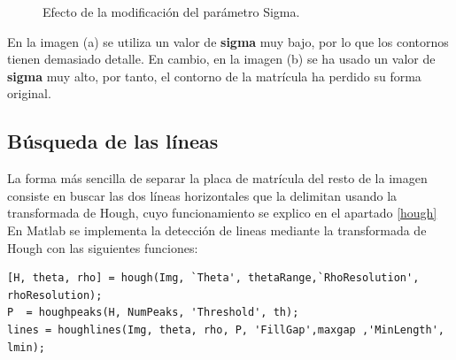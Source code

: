 \begin{figure}[!h]
\centering {}
\caption{\small{Efecto de la modificación del parámetro Sigma.}} \label{Cannysigma}
\end{figure} 

En la imagen (a) se utiliza un valor de \textbf{sigma} muy bajo, por lo que los contornos tienen demasiado detalle. En cambio, en la imagen (b) se ha usado un valor de \textbf{sigma} muy alto, por tanto, el contorno de la matrícula ha perdido su forma original.

\subsection{Búsqueda de las líneas}\label{Hough}
La forma más sencilla de separar la placa de matrícula del resto de la imagen consiste en buscar las dos líneas horizontales que la delimitan usando la transformada de Hough, cuyo funcionamiento se explico en el apartado \ref{hough}\\

En Matlab se implementa la detección de lineas mediante la transformada de Hough con las siguientes funciones:

\begin{lstlisting}
[H, theta, rho] = hough(Img, `Theta', thetaRange,`RhoResolution', rhoResolution);
P  = houghpeaks(H, NumPeaks, 'Threshold', th);
lines = houghlines(Img, theta, rho, P, 'FillGap',maxgap ,'MinLength', lmin);
\end{lstlisting}

